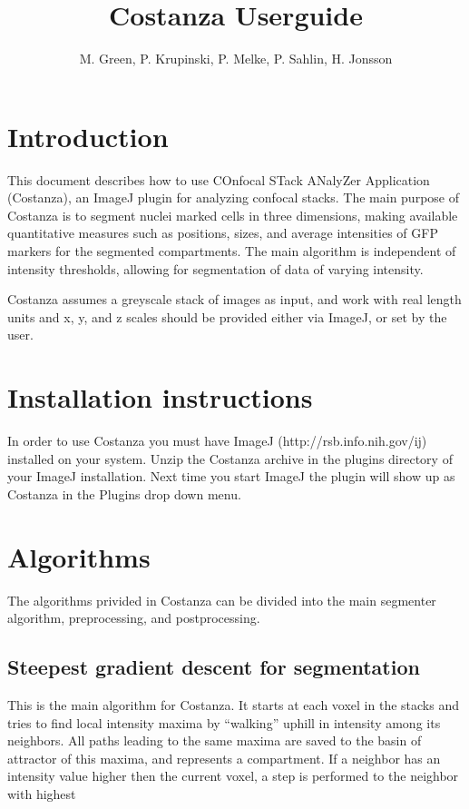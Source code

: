 \documentclass[a4paper,12pt]{article}
\title{Costanza Userguide}
\author{M. Green, P. Krupinski, P. Melke, P. Sahlin, H. Jonsson}
\begin{document}
\maketitle


\section{Introduction}

This document describes how to use COnfocal STack ANalyZer Application
(Costanza), an ImageJ\cite{Abramoff2004} plugin for analyzing confocal
stacks. The main purpose of Costanza is to segment nuclei marked cells
in three dimensions, making available quantitative measures such as
positions, sizes, and average intensities of GFP markers for the
segmented compartments. The main algorithm is independent of intensity
thresholds, allowing for segmentation of data of varying intensity.

Costanza assumes a greyscale stack of images as input, and work with
real length units and x, y, and z scales should be provided either via
ImageJ, or set by the user.

\section{Installation instructions}

In order to use Costanza you must have ImageJ
(http://rsb.info.nih.gov/ij) installed on your system. Unzip the
Costanza archive in the plugins directory of your ImageJ installation. Next
time you start ImageJ the plugin will show up as Costanza in the Plugins drop
down menu.

\section{Algorithms}

The algorithms privided in Costanza can be divided into the main
segmenter algorithm, preprocessing, and postprocessing.

\subsection{Steepest gradient descent for segmentation}

This is the main algorithm for Costanza. It starts at each voxel in the stacks
and tries to find local intensity maxima by ``walking'' uphill in intensity
among its neighbors. All paths leading to the same maxima are saved to the
basin of attractor of this maxima, and represents a compartment. If a neighbor
has an intensity value higher then the current voxel, a step is performed to
the neighbor with highest
\end{document}
